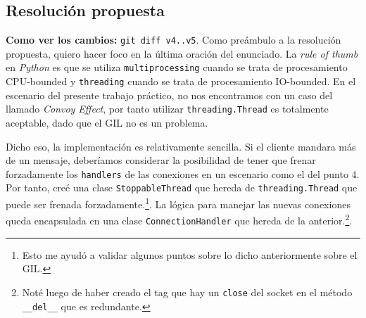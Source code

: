 \documentclass{article}
\begin{document}
\subsection{Resolución propuesta}

\textbf{Como ver los cambios: }\texttt{git diff v4..v5}.
Como preámbulo a la resolución propuesta, quiero hacer foco en la última oración del enunciado. La \textit{rule of thumb} en \textit{Python} es que se utiliza \texttt{multiprocessing} cuando se trata de procesamiento CPU-bounded y \texttt{threading} cuando se trata de procesamiento IO-bounded. En el escenario del presente trabajo práctico, no nos encontramos con un caso del llamado \textit{Convoy Effect}\cite{ConvoyEffect}, por tanto utilizar \texttt{threading.Thread} es totalmente aceptable\cite{TTM}, dado que el GIL no es un problema.

Dicho eso, la implementación es relativamente sencilla. Si el cliente mandara más de un mensaje, deberíamos considerar la posibilidad de tener que frenar forzadamente los \texttt{handlers} de las conexiones en un escenario como el del punto 4. Por tanto, creé una clase \texttt{StoppableThread} que hereda de \texttt{threading.Thread} que puede ser frenada forzadamente.\footnote{Esto me ayudó a validar algunos puntos sobre lo dicho anteriormente sobre el GIL.}. La lógica para manejar las nuevas conexiones queda encapsulada en una clase \texttt{ConnectionHandler} que hereda de la anterior.\footnote{Noté luego de haber creado el tag que hay un \texttt{close} del socket en el método \texttt{\_\_del\_\_} que es redundante.}.

\printbibliography
\end{document}
